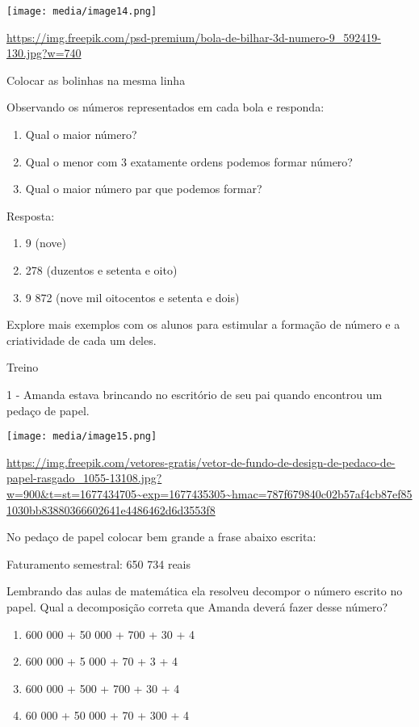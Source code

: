 \texttt{[image: media/image14.png]}

\url{https://img.freepik.com/psd-premium/bola-de-bilhar-3d-numero-9_592419-130.jpg?w=740}

Colocar as bolinhas na mesma linha

Observando os números representados em cada bola e responda:

\begin{enumerate}
\def\labelenumi{\alph{enumi})}
\item
  Qual o maior número?
\item
  Qual o menor com 3 exatamente ordens podemos formar número?
\item
  Qual o maior número par que podemos formar?
\end{enumerate}

Resposta:

\begin{enumerate}
\def\labelenumi{\alph{enumi})}
\item
  9 (nove)
\item
  278 (duzentos e setenta e oito)
\item
  9 872 (nove mil oitocentos e setenta e dois)
\end{enumerate}

Explore mais exemplos com os alunos para estimular a formação de número
e a criatividade de cada um deles.

Treino

1 - Amanda estava brincando no escritório de seu pai quando encontrou um
pedaço de papel.

\texttt{[image: media/image15.png]}

\url{https://img.freepik.com/vetores-gratis/vetor-de-fundo-de-design-de-pedaco-de-papel-rasgado_1055-13108.jpg?w=900\&t=st=1677434705~exp=1677435305~hmac=787f679840c02b57af4cb87ef851030bb83880366602641e4486462d6d3553f8}

No pedaço de papel colocar bem grande a frase abaixo escrita:

Faturamento semestral: 650 734 reais

Lembrando das aulas de matemática ela resolveu decompor o número escrito
no papel. Qual a decomposição correta que Amanda deverá fazer desse
número?

\begin{enumerate}
\def\labelenumi{\alph{enumi})}
\item
  600 000 + 50 000 + 700 + 30 + 4
\item
  600 000 + 5 000 + 70 + 3 + 4
\item
  600 000 + 500 + 700 + 30 + 4
\item
  60 000 + 50 000 + 70 + 300 + 4
\end{enumerate}

